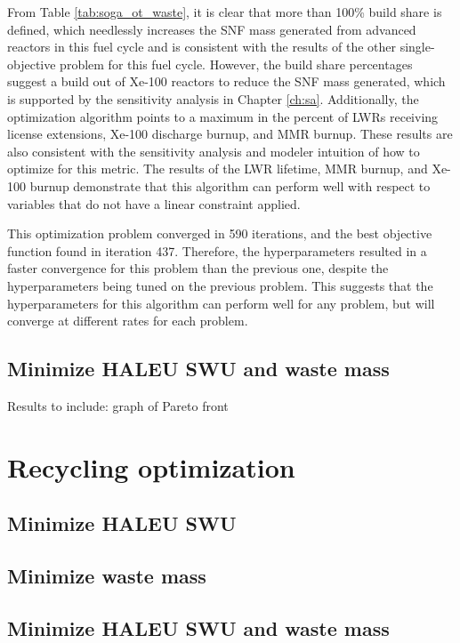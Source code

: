 From Table \ref{tab:soga_ot_waste}, it is clear that more than 100\% build share
is defined, which needlessly increases the \gls{SNF} mass generated from 
advanced reactors in this fuel cycle and is consistent with the results of 
the other single-objective problem for this fuel cycle. However, the build share 
percentages suggest 
a build out of Xe-100 reactors to reduce the \gls{SNF} mass generated, which 
is supported by the sensitivity analysis in Chapter \ref{ch:sa}. Additionally, 
the optimization algorithm points to a maximum in the percent of \glspl{LWR} 
receiving license extensions, Xe-100 discharge burnup, and \gls{MMR} burnup. 
These results are also consistent with the sensitivity analysis and 
modeler intuition of how to optimize for this metric. The results of the 
\gls{LWR} lifetime, \gls{MMR} burnup, and Xe-100 burnup demonstrate that this 
algorithm can perform well with respect to variables that do not have a 
linear constraint applied. 

This optimization problem converged in 590 iterations, and the best objective 
function found in iteration 437. Therefore, the hyperparameters resulted 
in a faster convergence for this problem than the previous one, despite the 
hyperparameters being tuned on the previous problem. This suggests that 
the hyperparameters for this algorithm can perform well for any problem, 
but will converge at different rates for each problem. 

\subsection{Minimize HALEU SWU and waste mass}

Results to include: graph of Pareto front

\section{Recycling optimization}
\subsection{Minimize HALEU SWU}

\subsection{Minimize waste mass}

\subsection{Minimize HALEU SWU and waste mass}

